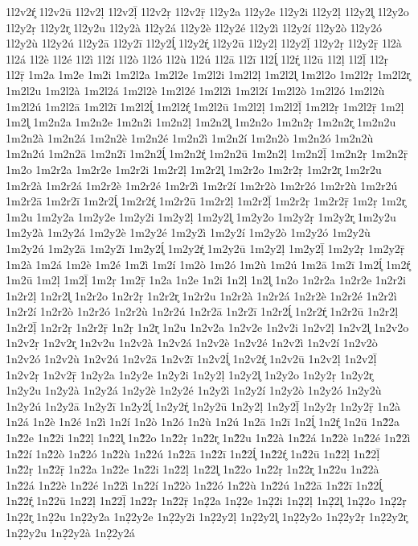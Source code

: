 {1l2v2ŕ̥
1l2v2ū
1l2v2ḷ
1l2v2ḹ
1l2v2ṛ
1l2v2ṝ
1l2y2a
1l2y2e
1l2y2i
1l2y2ḷ
1l2y2l̥
1l2y2o
1l2y2ṛ
1l2y2r̥
1l2y2u
1l2y2à
1l2y2á
1l2y2è
1l2y2é
1l2y2ì
1l2y2í
1l2y2ò
1l2y2ó
1l2y2ù
1l2y2ú
1l2y2ā
1l2y2ī
1l2y2ĺ̥
1l2y2ŕ̥
1l2y2ū
1l2y2ḷ
1l2y2ḹ
1l2y2ṛ
1l2y2ṝ
1l2à
1l2á
1l2è
1l2é
1l2ì
1l2í
1l2ò
1l2ó
1l2ù
1l2ú
1l2ā
1l2ī
1l2ĺ̥
1l2ŕ̥
1l2ū
1l2ḷ
1l2ḹ
1l2ṛ
1l2ṝ
1m2a
1m2e
1m2i
1m2l2a
1m2l2e
1m2l2i
1m2l2ḷ
1m2l2l̥
1m2l2o
1m2l2ṛ
1m2l2r̥
1m2l2u
1m2l2à
1m2l2á
1m2l2è
1m2l2é
1m2l2ì
1m2l2í
1m2l2ò
1m2l2ó
1m2l2ù
1m2l2ú
1m2l2ā
1m2l2ī
1m2l2ĺ̥
1m2l2ŕ̥
1m2l2ū
1m2l2ḷ
1m2l2ḹ
1m2l2ṛ
1m2l2ṝ
1m2ḷ
1m2l̥
1m2n2a
1m2n2e
1m2n2i
1m2n2ḷ
1m2n2l̥
1m2n2o
1m2n2ṛ
1m2n2r̥
1m2n2u
1m2n2à
1m2n2á
1m2n2è
1m2n2é
1m2n2ì
1m2n2í
1m2n2ò
1m2n2ó
1m2n2ù
1m2n2ú
1m2n2ā
1m2n2ī
1m2n2ĺ̥
1m2n2ŕ̥
1m2n2ū
1m2n2ḷ
1m2n2ḹ
1m2n2ṛ
1m2n2ṝ
1m2o
1m2r2a
1m2r2e
1m2r2i
1m2r2ḷ
1m2r2l̥
1m2r2o
1m2r2ṛ
1m2r2r̥
1m2r2u
1m2r2à
1m2r2á
1m2r2è
1m2r2é
1m2r2ì
1m2r2í
1m2r2ò
1m2r2ó
1m2r2ù
1m2r2ú
1m2r2ā
1m2r2ī
1m2r2ĺ̥
1m2r2ŕ̥
1m2r2ū
1m2r2ḷ
1m2r2ḹ
1m2r2ṛ
1m2r2ṝ
1m2ṛ
1m2r̥
1m2u
1m2y2a
1m2y2e
1m2y2i
1m2y2ḷ
1m2y2l̥
1m2y2o
1m2y2ṛ
1m2y2r̥
1m2y2u
1m2y2à
1m2y2á
1m2y2è
1m2y2é
1m2y2ì
1m2y2í
1m2y2ò
1m2y2ó
1m2y2ù
1m2y2ú
1m2y2ā
1m2y2ī
1m2y2ĺ̥
1m2y2ŕ̥
1m2y2ū
1m2y2ḷ
1m2y2ḹ
1m2y2ṛ
1m2y2ṝ
1m2à
1m2á
1m2è
1m2é
1m2ì
1m2í
1m2ò
1m2ó
1m2ù
1m2ú
1m2ā
1m2ī
1m2ĺ̥
1m2ŕ̥
1m2ū
1m2ḷ
1m2ḹ
1m2ṛ
1m2ṝ
1n2a
1n2e
1n2i
1n2ḷ
1n2l̥
1n2o
1n2r2a
1n2r2e
1n2r2i
1n2r2ḷ
1n2r2l̥
1n2r2o
1n2r2ṛ
1n2r2r̥
1n2r2u
1n2r2à
1n2r2á
1n2r2è
1n2r2é
1n2r2ì
1n2r2í
1n2r2ò
1n2r2ó
1n2r2ù
1n2r2ú
1n2r2ā
1n2r2ī
1n2r2ĺ̥
1n2r2ŕ̥
1n2r2ū
1n2r2ḷ
1n2r2ḹ
1n2r2ṛ
1n2r2ṝ
1n2ṛ
1n2r̥
1n2u
1n2v2a
1n2v2e
1n2v2i
1n2v2ḷ
1n2v2l̥
1n2v2o
1n2v2ṛ
1n2v2r̥
1n2v2u
1n2v2à
1n2v2á
1n2v2è
1n2v2é
1n2v2ì
1n2v2í
1n2v2ò
1n2v2ó
1n2v2ù
1n2v2ú
1n2v2ā
1n2v2ī
1n2v2ĺ̥
1n2v2ŕ̥
1n2v2ū
1n2v2ḷ
1n2v2ḹ
1n2v2ṛ
1n2v2ṝ
1n2y2a
1n2y2e
1n2y2i
1n2y2ḷ
1n2y2l̥
1n2y2o
1n2y2ṛ
1n2y2r̥
1n2y2u
1n2y2à
1n2y2á
1n2y2è
1n2y2é
1n2y2ì
1n2y2í
1n2y2ò
1n2y2ó
1n2y2ù
1n2y2ú
1n2y2ā
1n2y2ī
1n2y2ĺ̥
1n2y2ŕ̥
1n2y2ū
1n2y2ḷ
1n2y2ḹ
1n2y2ṛ
1n2y2ṝ
1n2à
1n2á
1n2è
1n2é
1n2ì
1n2í
1n2ò
1n2ó
1n2ù
1n2ú
1n2ā
1n2ī
1n2ĺ̥
1n2ŕ̥
1n2ū
1n2̃2a
1n2̃2e
1n2̃2i
1n2̃2ḷ
1n2̃2l̥
1n2̃2o
1n2̃2ṛ
1n2̃2r̥
1n2̃2u
1n2̃2à
1n2̃2á
1n2̃2è
1n2̃2é
1n2̃2ì
1n2̃2í
1n2̃2ò
1n2̃2ó
1n2̃2ù
1n2̃2ú
1n2̃2ā
1n2̃2ī
1n2̃2ĺ̥
1n2̃2ŕ̥
1n2̃2ū
1n2̃2ḷ
1n2̃2ḹ
1n2̃2ṛ
1n2̃2ṝ
1n2̇2a
1n2̇2e
1n2̇2i
1n2̇2ḷ
1n2̇2l̥
1n2̇2o
1n2̇2ṛ
1n2̇2r̥
1n2̇2u
1n2̇2à
1n2̇2á
1n2̇2è
1n2̇2é
1n2̇2ì
1n2̇2í
1n2̇2ò
1n2̇2ó
1n2̇2ù
1n2̇2ú
1n2̇2ā
1n2̇2ī
1n2̇2ĺ̥
1n2̇2ŕ̥
1n2̇2ū
1n2̇2ḷ
1n2̇2ḹ
1n2̇2ṛ
1n2̇2ṝ
1n2̣2a
1n2̣2e
1n2̣2i
1n2̣2ḷ
1n2̣2l̥
1n2̣2o
1n2̣2ṛ
1n2̣2r̥
1n2̣2u
1n2̣2y2a
1n2̣2y2e
1n2̣2y2i
1n2̣2y2ḷ
1n2̣2y2l̥
1n2̣2y2o
1n2̣2y2ṛ
1n2̣2y2r̥
1n2̣2y2u
1n2̣2y2à
1n2̣2y2á
}
